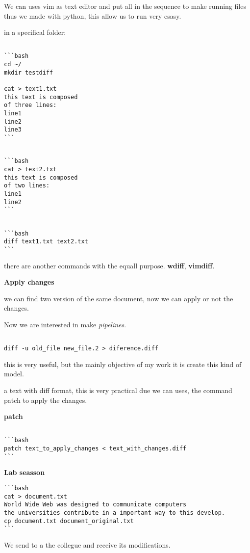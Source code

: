 \documentclass[10pt,a4paper]{article}
\begin{document}
We can uses vim as text editor and put all in the sequence to make 
running files thus we made with python, this allow us to run very esasy.

in a specifical folder:
\begin{verbatim}

```bash
cd ~/
mkdir testdiff

cat > text1.txt
this text is composed
of three lines:
line1
line2
line3
```

\end{verbatim}

\begin{verbatim}

```bash
cat > text2.txt
this text is composed
of two lines:
line1
line2
``` 
\end{verbatim}


\begin{verbatim}
				
```bash
diff text1.txt text2.txt
```
\end{verbatim} 
there are another commands with the equall purpose.
\textbf{wdiff}, \textbf{vimdiff}.

\textbf{Apply changes}

we can find two version of the same document, now we can apply or not the changes.

		
Now we are interested in make 
\textit{pipelines}.
		
\begin{verbatim}

diff -u old_file new_file.2 > diference.diff

\end{verbatim}

this is very useful, but the mainly objective of my work it is create this kind of model.

a text with diff format, this is very practical due we can uses, the command patch to apply the changes.

\textbf{patch}

\begin{verbatim}

```bash
patch text_to_apply_changes < text_with_changes.diff
```
\end{verbatim}


\textbf{Lab seasson}

\begin{verbatim}
```bash 
cat > document.txt
World Wide Web was designed to communicate computers
the universities contribute in a important way to this develop.
cp document.txt document_original.txt
```
\end{verbatim} 
We send to a the collegue and receive its modifications.
\end{document}
